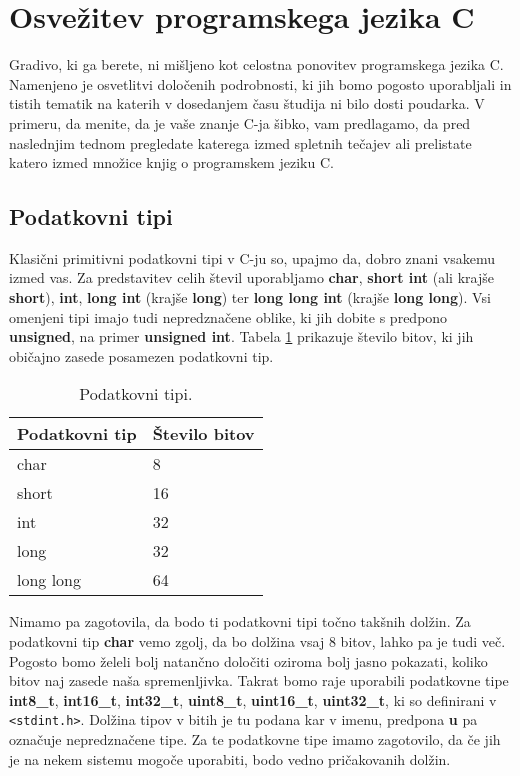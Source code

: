 \documentclass[12pt,letterpaper]{article}
\begin{document}
\section*{Osvežitev programskega jezika C}

Gradivo, ki ga berete, ni mišljeno kot celostna ponovitev programskega jezika C. Namenjeno je osvetlitvi določenih podrobnosti, ki jih bomo pogosto uporabljali in tistih tematik na katerih v dosedanjem času študija ni bilo dosti poudarka. V primeru, da menite, da je vaše znanje C-ja šibko, vam predlagamo, da pred naslednjim tednom pregledate katerega izmed spletnih tečajev ali prelistate katero izmed množice knjig o programskem jeziku C.


\subsection*{Podatkovni tipi}

Klasični primitivni podatkovni tipi v C-ju so, upajmo da, dobro znani vsakemu izmed vas. Za predstavitev celih števil uporabljamo \textbf{char}, \textbf{short int} (ali krajše \textbf{short}), \textbf{int}, \textbf{long int} (krajše \textbf{long}) ter \textbf{long long int} (krajše \textbf{long long}). Vsi omenjeni tipi imajo tudi nepredznačene oblike, ki jih dobite s predpono \textbf{unsigned}, na primer \textbf{unsigned int}. Tabela \ref{byti} prikazuje število bitov, ki jih običajno zasede posamezen podatkovni tip.

\begin{table}[ht!]
    \caption{Podatkovni tipi.}
    \centering
    \begin{tabular}{|l|l|}
        \hline
        Podatkovni tip & Število bitov  \\ \hline
        char           & 8              \\ \hline
        short          & 16             \\ \hline
        int            & 32             \\ \hline
        long           & 32             \\ \hline
        long long      & 64             \\ \hline
    \end{tabular}
    \label{byti}
\end{table}

Nimamo pa zagotovila, da bodo ti podatkovni tipi točno takšnih dolžin. Za podatkovni tip \textbf{char} vemo zgolj, da bo dolžina vsaj 8 bitov, lahko pa je tudi več. Pogosto bomo želeli bolj natančno določiti oziroma bolj jasno pokazati, koliko bitov naj zasede naša spremenljivka. Takrat bomo raje uporabili podatkovne tipe \textbf{int8\_t}, \textbf{int16\_t}, \textbf{int32\_t}, \textbf{uint8\_t}, \textbf{uint16\_t}, \textbf{uint32\_t}, ki so definirani v \texttt{<stdint.h>}. Dolžina tipov v bitih je tu podana kar v imenu, predpona \textbf{u} pa označuje nepredznačene tipe. Za te podatkovne tipe imamo zagotovilo, da če jih je na nekem sistemu mogoče uporabiti, bodo vedno pričakovanih dolžin.
\end{document}
